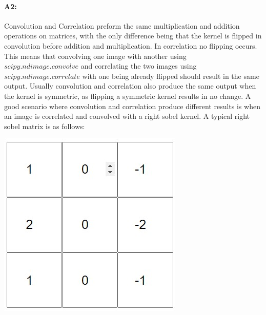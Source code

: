 \paragraph{A2:} Convolution and Correlation preform the same multiplication and addition operations on matrices, with the only difference being that the kernel is flipped in convolution before addition and multiplication. In correlation no flipping occurs. This means that convolving one image with another using \href{https://docs.scipy.org/doc/scipy/reference/generated/scipy.ndimage.convolve.html}{$scipy.ndimage.convolve$} and correlating the two images using \href{https://docs.scipy.org/doc/scipy/reference/generated/scipy.ndimage.correlate.html}{$scipy.ndimage.correlate$} with one being already flipped should result in the same output. Usually convolution and correlation also produce the same output when the kernel is symmetric, as flipping a symmetric kernel results in no change. A good scenario where convolution and correlation produce different results is when an image is correlated and convolved with a right sobel kernel. A typical right sobel matrix is as follows:
\begin{center}
  \includegraphics[scale=0.5]{matrix.jpg}  
\end{center}
